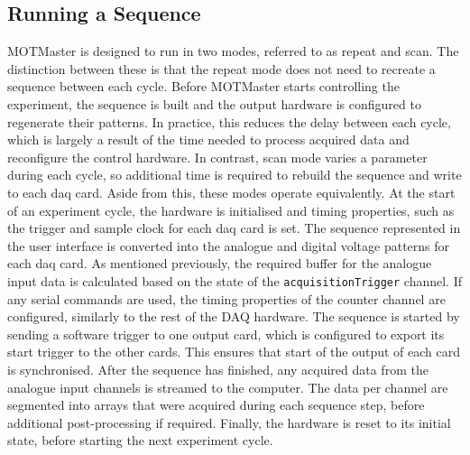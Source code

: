 \subsection{Running a Sequence}
MOTMaster is designed to run in two modes, referred to as repeat and scan.
The distinction between these is that the repeat mode does not need to
recreate a sequence between each cycle. Before MOTMaster starts controlling
the experiment, the sequence is built and the output hardware is configured
to regenerate their patterns. In practice, this reduces the delay between
each cycle, which is largely a result of the time needed to process acquired
data and reconfigure the control hardware. In contrast, scan mode varies a
parameter during each cycle, so additional time is required to rebuild the
sequence and write to each \ac{daq} card. Aside from this, these modes
operate equivalently. At the start of an experiment cycle, the hardware is
initialised and timing properties, such as the trigger and sample clock for
each \ac{daq} card is set. The sequence represented in the user interface is
converted into the analogue and digital voltage patterns for each \ac{daq}
card. As mentioned previously, the required buffer for the analogue input
data is calculated based on the state of the \verb|acquisitionTrigger|
channel. If any serial commands are used, the timing properties of the
counter channel are configured, similarly to the rest of the \ac{DAQ}
hardware. The sequence is started by sending a software trigger to one output
card, which is configured to export its start trigger to the other cards.
This ensures that start of the output of each card is synchronised. After the
sequence has finished, any acquired data from the analogue input channels is
streamed to the computer. The data per channel are segmented into arrays that
were acquired during each sequence step, before additional post-processing if
required. Finally, the hardware is reset to its initial state, before
starting the next experiment cycle.
